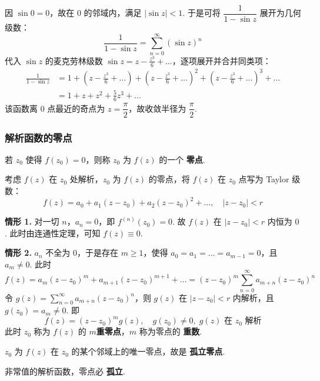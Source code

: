 \documentclass[openany,oneside]{ctexbook}
\begin{document}
\begin{solution}
因 \( \sin 0=0 \)，故在 \( 0 \) 的邻域内，满足 \( |\sin z|<1 \).
于是可将 \( \dfrac{1}{1-\sin z} \) 展开为几何级数：
\[
\frac{1}{1-\sin z} = \sum_{n=0}^{\infty} (\sin z)^n
\]
代入 \( \sin z \) 的麦克劳林级数 \( \sin z = z - \frac{z^3}{6} + \dots \)，逐项展开并合并同类项：
\[
\begin{aligned}
\frac{1}{1-\sin z}
&= 1 + \left(z - \frac{z^3}{6} + \dots\right) + \left(z - \frac{z^3}{6} + \dots\right)^2 + \left(z - \frac{z^3}{6} + \dots\right)^3 + \dots \\
&= 1 + z + z^2 + \frac{5}{6}z^3 + \dots
\end{aligned}
\]
该函数离 \( 0 \) 点最近的奇点为 \( z=\dfrac{\pi}{2} \)，故收敛半径为 \( \dfrac{\pi}{2} \).
\end{solution}
\subsubsection{解析函数的零点}

\begin{definition}
若 \( z_0 \) 使得 \( f(z_0)=0 \)，则称 \( z_0 \) 为 \( f(z) \) 的一个 \textbf{零点}.
\end{definition}

考虑 \( f(z) \) 在 \( z_0 \) 处解析，\( z_0 \) 为 \( f(z) \) 的零点，将 \( f(z) \) 在 \( z_0 \) 点写为 Taylor 级数：
\[
f(z) = a_0 + a_1(z-z_0) + a_2(z-z_0)^2 + \dots,\quad |z-z_0|<r
\]

\noindent \textbf{情形 1.}
对一切 \( n \)，\( a_n=0 \)，即 \( f^{(n)}(z_0)=0 \).
故 \( f(z) \) 在 \( |z-z_0|<r \) 内恒为 \( 0 \).
此时由连通性定理，可知 \( f(z)\equiv 0 \).

\noindent \textbf{情形 2.}
\( a_n \) 不全为 \( 0 \)，于是存在 \( m\ge 1 \)，使得 \( a_0=a_1=\dots=a_{m-1}=0 \)，且 \( a_m\neq 0 \).
此时
\[
f(z) = a_m(z-z_0)^m + a_{m+1}(z-z_0)^{m+1} + \dots = (z-z_0)^m \sum_{n=0}^{\infty} a_{m+n}(z-z_0)^n
\]
令 \( g(z) = \sum_{n=0}^{\infty} a_{m+n}(z-z_0)^n \)，则 \( g(z) \) 在 \( |z-z_0|<r \) 内解析，且 \( g(z_0)=a_m\neq 0 \).
即
\[
f(z) = (z-z_0)^m g(z),\quad g(z_0)\neq 0,\; g(z)\text{ 在 }z_0\text{ 解析}
\]
此时 \( z_0 \) 称为 \( f(z) \) 的 $m$\textbf{重零点}，\( m \) 称为零点的 \textbf{重数}.

\( z_0 \) 为 \( f(z) \) 在 \( z_0 \) 的某个邻域上的唯一零点，故是 \textbf{孤立零点}.

\begin{theorem}
非常值的解析函数，零点必 \textbf{孤立}.
\end{theorem}
\end{document}
